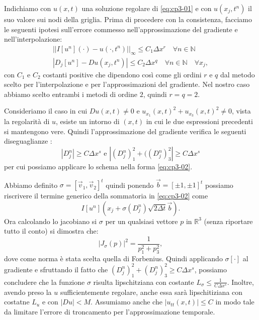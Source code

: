 Indichiamo con $u(x,t)$ una soluzione regolare di \eqref{eq:cp3-01} e con $u(x_j,t^n)$ il suo valore sui nodi della griglia.
Prima di procedere con la consistenza, facciamo le seguenti ipotesi sull'errore commesso nell'approssimazione del gradiente e nell'interpolazione:
\begin{gather}
\label{eq:cp3-04}
||I[u^n](\cdot)-u(\cdot,t^n)||_{\infty}\le C_1\Delta x^r\quad\forall n\in\mathbb{N} \\
\label{eq:cp3-05}
|D_j[u^n]-Du(x_j,t^n)|\le C_2\Delta x^q\quad\forall n\in\mathbb{N}\quad\forall x_j, 
\end{gather}
con $C_1$ e $C_2$ costanti positive che dipendono così come gli ordini $r$ e $q$ dal metodo scelto per l'interpolazione e per l'approssimazioni del gradiente. Nel nostro caso abbiamo scelto entrambi i metodi di ordine $2$, quindi $r=q=2$.

Consideriamo il caso in cui $Du(x,t)\ne 0$ e $u_{x_1}(x,t)^2+u_{x_3}(x,t)^2\ne 0$, vista la regolarità di $u$, esiste un intorno di $(x,t)$ in cui le due espressioni precedenti si mantengono vere. Quindi l'approssimazione del gradiente verifica le seguenti diseguaglianze :
\[
|D_j^n|\ge C\Delta x^s\text{ e }|(D_j^n)_1^2+((D_j^n)_3^2|\ge C\Delta x^s
\]
per cui possiamo applicare lo schema nella forma \eqref{eq:cp3-02}.
\begin{osservazione}
Abbiamo definito $\sigma=[\vec{v}_1,\vec{v}_2]^t$ quindi ponendo  $\vec{b}=[\pm1,\pm1]^t$ possiamo riscrivere il termine generico della sommatoria in \eqref{eq:cp3-02} come
\[
I[u^n](x_j+\sigma(D_j^n)\sqrt{2\Delta t}\vec{b}).
\]
Ora calcolando lo jacobiano si $\sigma$ per un qualsiasi vettore $p$ in $\mathbb{R}^3$ (senza riportare tutto il conto) si dimostra che:
\[
\left|J_{\sigma}(p)\right|^2=\frac{1}{p_1^2+p_3^2},
\]
dove come norma è stata scelta quella di Forbenius. Quindi applicando $\sigma[\cdot]$ al gradiente e sfruttando il fatto che $(D_j^n)_1^2+(D_j^n)_3^2\ge C\Delta x^s$, possiamo concludere che la funzione $\sigma$ risulta lipschitziana con costante $L_{\sigma}\le\frac{1}{C\Delta x^s}$.
Inoltre, avendo preso la $u$ sufficientemente regolare, anche essa sarà lipschitiziana con costatne $L_u$ e con $|Du|< M$. Assumiamo anche che $|u_{tt}(x,t)|\le C$ in modo tale da limitare l'errore di troncamento per l'approssimazione temporale.
\end{osservazione}

